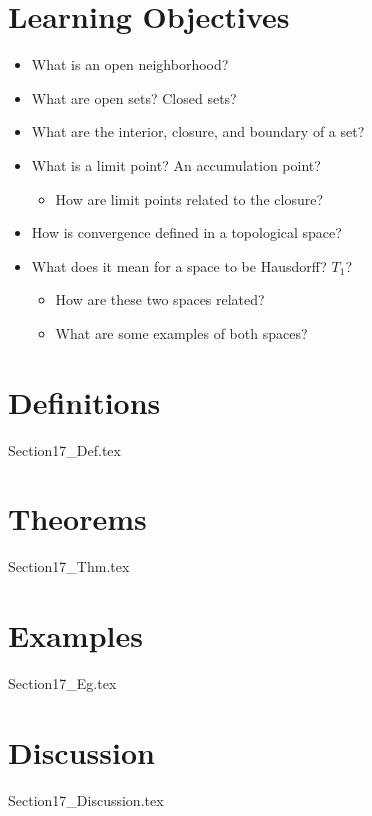 \section{Learning Objectives}

\begin{itemize}
    \item What is an open neighborhood?
    \item What are open sets? Closed sets?
    \item What are the interior, closure, and boundary of a set?
    \item What is a limit point? An accumulation point?
        \begin{itemize}
            \item How are limit points related to the closure?
        \end{itemize}
    \item How is convergence defined in a topological space?
    \item What does it mean for a space to be Hausdorff? \( T_{ 1 } \)?
        \begin{itemize}
            \item How are these two spaces related?
            \item What are some examples of both spaces?
        \end{itemize}
\end{itemize}

\section{Definitions}

{Section17_Def.tex}

\section{Theorems}

{Section17_Thm.tex}

\section{Examples}

{Section17_Eg.tex}

\section{Discussion}

{Section17_Discussion.tex}